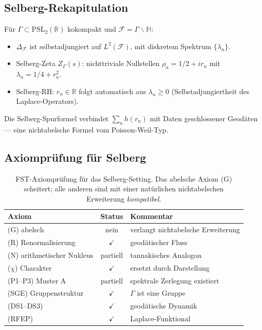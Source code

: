 \documentclass[11pt,a4paper]{article}
\theoremstyle{plain}
\theoremstyle{definition}
\newcommand{\R}{\mathbb{R}}
\newcommand{\chifn}{\chi}
\begin{document}
\subsection{Selberg-Rekapitulation}

Für $\Gamma \subset \mathrm{PSL}_2(\R)$ kokompakt und
$\mathcal F = \Gamma \backslash \mathbb H$:
\begin{itemize}
\item $\Delta_{\mathcal F}$ ist selbstadjungiert auf $L^2(\mathcal F)$,
  mit diskretem Spektrum $\{\lambda_n\}$.
\item Selberg-Zeta $Z_\Gamma(s)$: nichttriviale Nullstellen
  $\rho_n = 1/2 + i r_n$ mit $\lambda_n = 1/4 + r_n^2$.
\item Selberg-RH: $r_n \in \R$ folgt automatisch aus
  $\lambda_n \geq 0$ (Selbstadjungiertheit des Laplace-Operators).
\end{itemize}

Die Selberg-Spurformel verbindet $\sum_n h(r_n)$ mit Daten geschlossener
Geodäten --- eine nichtabelsche Formel vom Poisson-Weil-Typ.

\subsection{Axiomprüfung für Selberg}

\begin{table}[h]
\centering
\small
\begin{tabular}{@{}lcl@{}}
\toprule
\textbf{Axiom} & \textbf{Status} & \textbf{Kommentar} \\
\midrule
(G) abelsch & nein & verlangt nichtabelsche Erweiterung \\
(R) Renormalisierung & $\checkmark$ & geodätischer Fluss \\
(N) arithmetischer Nukleus & partiell & tannakisches Analogon \\
($\chifn$) Charakter & $\checkmark$ & ersetzt durch Darstellung \\
(P1--P3) Muster A & partiell & spektrale Zerlegung existiert \\
(SGE) Gruppenstruktur & $\checkmark$ & $\Gamma$ ist eine Gruppe \\
(DS1--DS3) & $\checkmark$ & geodätische Dynamik \\
(RFEP) & $\checkmark$ & Laplace-Funktional \\
\bottomrule
\end{tabular}
\caption{FST-Axiomprüfung für das Selberg-Setting. Das abelsche
Axiom (G) scheitert; alle anderen sind mit einer natürlichen
nichtabelschen Erweiterung \emph{kompatibel}.}
\label{tab:selberg-axioms}
\end{table}
\end{document}

